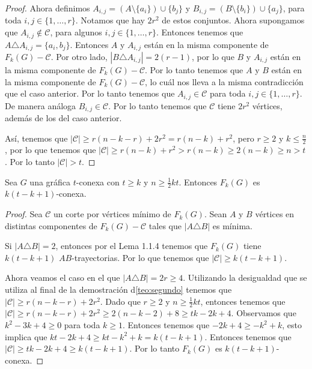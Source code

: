 \begin{proof}
Ahora definimos $A_{i,j} = (A\setminus \{a_i\}) \cup \{b_j\}$ y $B_{i,j} =
(B\setminus \{b_i\}) \cup \{a_j\}$, para toda $ i, j \in \{1, \dots, r\}$.
Notamos que hay $2r^2$ de estos conjuntos. Ahora supongamos que $A_{i,j} \notin
\mathcal{C}$, para algunos $ i, j \in \{1, \dots, r\}$. Entonces tenemos que $A
\triangle A_{i,j} = \{a_i, b_j\}$. Entonces $A$ y $A_{i,j}$ est\'an en la misma
componente de $F_k(G)- \mathcal{C}$. Por otro lado, $|B \triangle A_{i,j}| = 2
(r-1)$, por lo que $B$ y $A_{i,j}$ est\'an en la misma componente de $F_k(G) -
\mathcal{C}$. Por lo tanto tenemos que $A$ y $B$ est\'an en la misma componente
de $F_k(G)-\mathcal{C}$, lo cu\'al nos lleva a la misma contradicci\'on que el
caso anterior. Por lo tanto tenemos que $A_{i,j} \in \mathcal{C}$ para toda $i,
j \in \{1, \dots, r\}$. De manera an\'aloga $B_{i,j} \in \mathcal{C}$. Por lo
tanto tenemos que $\mathcal{C}$ tiene $2r^2$ v\'ertices, adem\'as de los del
caso anterior.

As\'i, tenemos que $|\mathcal{C}|\geq r(n-k-r)+2r^2 = r(n-k) + r^2$, pero $r
\geq 2$ y $k \leq \frac{n}{2}$, por lo que tenemos que $|\mathcal{C}| \geq
r(n-k)+r^2 > r(n-k) \geq 2(n-k) \geq n >t$. Por lo tanto $|\mathcal{C}|>t$.
\end{proof} 

\begin{teorema}%
    \label{teo:tercero}
        Sea $G$ una gr\'afica $t$-conexa con $t \ge k$ y $n \ge \frac{1}{2} kt$.
        Entonces $F_{k}(G)$ es $k (t- k+ 1)$-conexa.
    \end{teorema}

    \begin{proof}
        Sea $\mathcal{C}$ un corte por v\'ertices m\'i{}nimo de $F_k(G)$. Sean
        $A$ y $B$ v\'ertices en distintas componentes de $F_k(G)- \mathcal{C}$
        tales que $|A \triangle B|$ es m\'i{}nima.

        Si $|A \triangle B| = 2$, entonces por el Lema 1.1.4 tenemos que
        $F_k(G)$ tiene $k (t- k+ 1)$ $AB$-trayectorias. Por lo que tenemos que
        $|\mathcal{C}| \geq k (t- k+ 1)$.

        Ahora veamos el caso en el que $|A \triangle B| = 2r \ge 4$. Utilizando
        la desigualdad que se utiliza al final de la demostraci\'on
        d\cref{teo:segundo} tenemos que $|\mathcal{C}| \ge r(n-k-r)+2r^2$. Dado
        que $r \ge 2$ y $n \ge \frac{1}{2}kt$, entonces tenemos que
        $|\mathcal{C}| \ge r(n-k-r)+2r^2 \ge 2 (n- k -2) + 8 \ge tk - 2k+ 4$.
        Observamos que $k^2 -3k + 4 \ge 0$ para toda $k \ge 1$. Entonces tenemos
        que $-2k+4 \ge -k^2 + k$, esto implica que $kt -2k +4 \ge kt - k^2 + k =
        k (t - k +1)$. Entonces tenemos que $|\mathcal{C}| \ge tk -2k +4 \ge
        k(t-k+1)$. Por lo tanto $F_k(G)$ es $k(t-k+1)$-conexa.
    \end{proof}